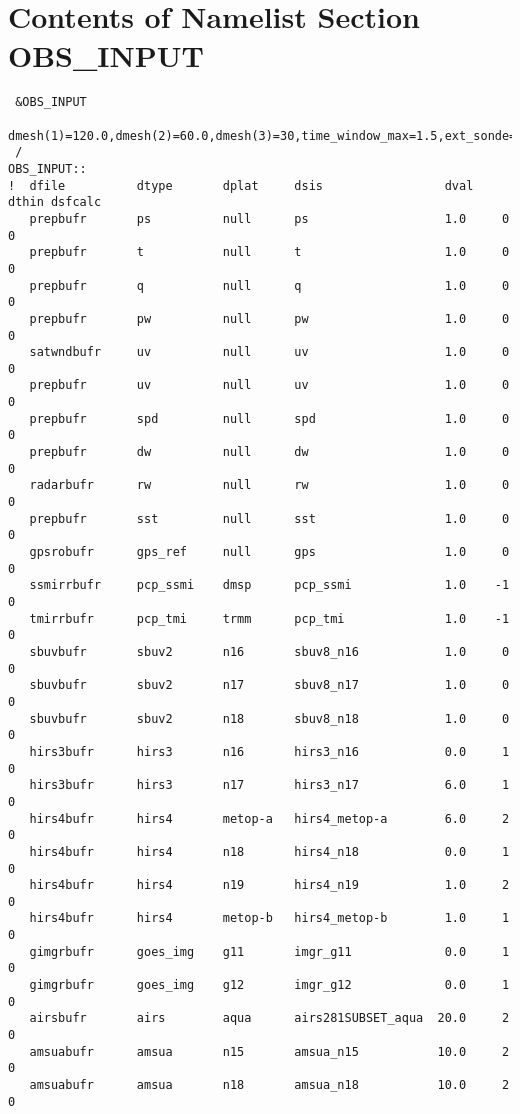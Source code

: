 \chapter{Contents of Namelist Section OBS\_INPUT}

\begin{scriptsize}
\begin{verbatim}
 &OBS_INPUT
   dmesh(1)=120.0,dmesh(2)=60.0,dmesh(3)=30,time_window_max=1.5,ext_sonde=.true.,
 /
OBS_INPUT::
!  dfile          dtype       dplat     dsis                 dval    dthin dsfcalc
   prepbufr       ps          null      ps                   1.0     0     0
   prepbufr       t           null      t                    1.0     0     0
   prepbufr       q           null      q                    1.0     0     0
   prepbufr       pw          null      pw                   1.0     0     0
   satwndbufr     uv          null      uv                   1.0     0     0
   prepbufr       uv          null      uv                   1.0     0     0
   prepbufr       spd         null      spd                  1.0     0     0
   prepbufr       dw          null      dw                   1.0     0     0
   radarbufr      rw          null      rw                   1.0     0     0
   prepbufr       sst         null      sst                  1.0     0     0
   gpsrobufr      gps_ref     null      gps                  1.0     0     0
   ssmirrbufr     pcp_ssmi    dmsp      pcp_ssmi             1.0    -1     0
   tmirrbufr      pcp_tmi     trmm      pcp_tmi              1.0    -1     0
   sbuvbufr       sbuv2       n16       sbuv8_n16            1.0     0     0
   sbuvbufr       sbuv2       n17       sbuv8_n17            1.0     0     0
   sbuvbufr       sbuv2       n18       sbuv8_n18            1.0     0     0
   hirs3bufr      hirs3       n16       hirs3_n16            0.0     1     0
   hirs3bufr      hirs3       n17       hirs3_n17            6.0     1     0
   hirs4bufr      hirs4       metop-a   hirs4_metop-a        6.0     2     0
   hirs4bufr      hirs4       n18       hirs4_n18            0.0     1     0
   hirs4bufr      hirs4       n19       hirs4_n19            1.0     2     0
   hirs4bufr      hirs4       metop-b   hirs4_metop-b        1.0     1     0
   gimgrbufr      goes_img    g11       imgr_g11             0.0     1     0
   gimgrbufr      goes_img    g12       imgr_g12             0.0     1     0
   airsbufr       airs        aqua      airs281SUBSET_aqua  20.0     2     0
   amsuabufr      amsua       n15       amsua_n15           10.0     2     0
   amsuabufr      amsua       n18       amsua_n18           10.0     2     0

\end{verbatim}
\end{scriptsize}
